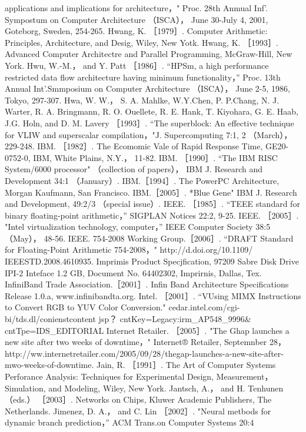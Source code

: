 applications and implications for architecture，" Proc. 28th Anmual Inf'. Sympostum on Computer Architecture （ISCA）， June
30-July 4, 2001, Goteborg, Sweden, 254-265.
Hwang, K. ［1979］. Computer Arithmetic: Principles, Architecture, and Desig, Wiley, New Yotk.
Hwang, K. ［1993］. Advanced Computer Architectre and Parallel Programming, McGraw-Hill, New York.
Hwu, W.-M.， and Y. Patt ［1986］. “HPSm, a high performance restricted data flow architecture having minimum functionality，”
Proc. 13th Annual Int'.Smmposium on Computer Architecture （ISCA）， June 2-5, 1986, Tokyo, 297-307.
Hwa, W. W.， S. A. Mahlke, W.Y.Chen, P. P.Chang, N. J. Warter, R. A. Bringmann, R. O. Ouellete, R. E. Hank, T. Kiyohara, G.
E. Haab, J.G. Holn, and D. M. Lavery ［1993］. “The superblock: An effective technique for VLIW and superscalar
compilation，"J. Supercomputing 7:1, 2 （March）， 229-248.
IBM. ［1982］. The Ecomomic Vale of Rapid Response Time, GE20-0752-0, IBM, White Plains, N.Y.， 11-82.
IBM. ［1990］. “The IBM RISC System/6000 processor" （collection of papers）， IBM J. Research and Development 34:1 （January）.
IBM.［1994］. The PowerPC Architecture, Morgan Kaufmann, San Francisco.
IBM.［2005］. *Blue Gene" IBM J. Research and Development, 49:2/3 （special issue）.
IEEE. ［1985］. “TEEE standard for binary floating-point arithmetic，” SIGPLAN Notices 22:2, 9-25.
IEEE. ［2005］. "Intel virtualization technology, computer，” IEEE Computer Society 38:5 （May）， 48-56.
IEEE. 754-2008 Working Group.［2006］. “DRAFT Standard for Floating-Point Arithmetic 754-2008，" http://d.doi.org/10.1109/
IEEESTD.2008.4610935.
Imprimis Product Specjfication, 97209 Sabre Disk Drive IPI-2 Inteface 1.2 GB, Document No. 64402302, Imprirnis, Dallas, Tex.
InfiniBand Trade Association.［2001］. Infin Band Architecture Specifications Release 1.0.a, www.infinibandta.org.
Intel. ［2001］. “VUsing MIMX Instructions to Convert RGB to YUV Color Conversion." cedar.intel.com/cgi-bi/tds.dl/conienstcontent jsp？
cntKey=Legacy:irm_AP548_9996& cntTpe=IDS_EDITORIAL
Internet Retailer. ［2005］. "The Ghap launches a new site after two weeks of downtime，" Internet® Retailer, Septemnber 28，
http://ww.internetretailer.com/2005/09/28/thegap-launches-a-new-site-after-mwo-weeks-of-downtime.
Jain, R. ［1991］. The Art of Computer Systems Perforance Analysis: Techniques for Experimental Design, Measurement，
Simulation, and Modeling, Wiley, New York.
Jantsch, A.， and H. Tenhunen （eds.） ［2003］. Networks on Chips, Kluwer Academic Publishers, The Netherlands.
Jimenez, D. A.， and C. Lin ［2002］. "Neural metbods for dynamic branch prediction，” ACM Trans.on Computer Systems 20:4
